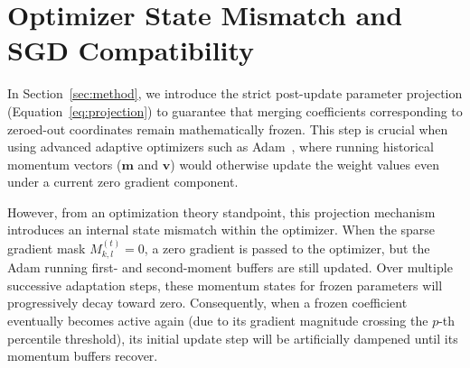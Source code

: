 \documentclass{article}
\theoremstyle{plain}
\theoremstyle{definition}
\theoremstyle{remark}
\begin{document}










\newpage
\appendix
\onecolumn
\section{Optimizer State Mismatch and SGD Compatibility}
\label{app:optimizer_state}

In Section~\ref{sec:method}, we introduce the strict post-update parameter projection (Equation~\ref{eq:projection}) to guarantee that merging coefficients corresponding to zeroed-out coordinates remain mathematically frozen. This step is crucial when using advanced adaptive optimizers such as Adam~\cite{kingma2014adam}, where running historical momentum vectors ($\mathbf{m}$ and $\mathbf{v}$) would otherwise update the weight values even under a current zero gradient component.

However, from an optimization theory standpoint, this projection mechanism introduces an internal state mismatch within the optimizer. When the sparse gradient mask $M_{k, l}^{(t)} = 0$, a zero gradient is passed to the optimizer, but the Adam running first- and second-moment buffers are still updated. Over multiple successive adaptation steps, these momentum states for frozen parameters will progressively decay toward zero. Consequently, when a frozen coefficient eventually becomes active again (due to its gradient magnitude crossing the $p$-th percentile threshold), its initial update step will be artificially dampened until its momentum buffers recover.
\end{document}
